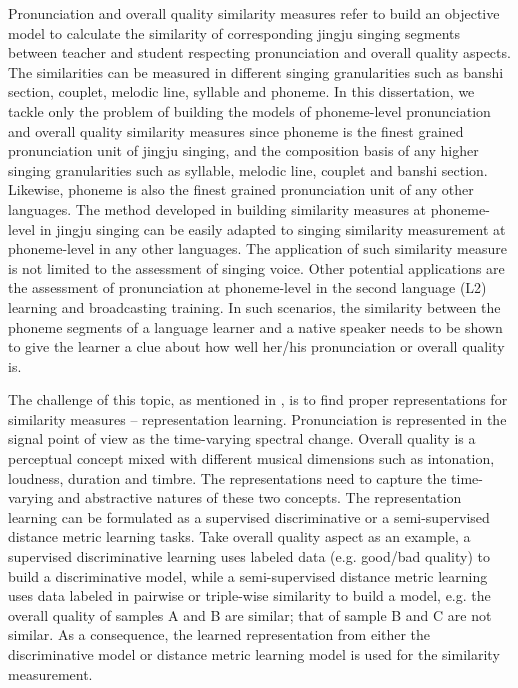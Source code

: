 Pronunciation and overall quality similarity measures refer to build an objective model to calculate the similarity of corresponding jingju singing segments between teacher and student respecting pronunciation and overall quality aspects. The similarities can be measured in different singing granularities such as banshi section, couplet, melodic line, syllable and phoneme. In this dissertation, we tackle only the problem of building the models of phoneme-level pronunciation and overall quality similarity measures since phoneme is the finest grained pronunciation unit of jingju singing, and the composition basis of any higher singing granularities such as syllable, melodic line, couplet and banshi section. Likewise, phoneme is also the finest grained pronunciation unit of any other languages. The method developed in building similarity measures at phoneme-level in jingju singing can be easily adapted to singing similarity measurement at phoneme-level in any other languages. The application of such similarity measure is not limited to the assessment of singing voice. Other potential applications are the assessment of pronunciation at phoneme-level in the second language (L2) learning and broadcasting training. In such scenarios, the similarity between the phoneme segments of a language learner and a native speaker needs to be shown to give the learner a clue about how well her/his pronunciation or overall quality is. 

The challenge of this topic, as mentioned in , is to find proper representations for similarity measures -- representation learning. Pronunciation is represented in the signal point of view as the time-varying spectral change. Overall quality is a perceptual concept mixed with different musical dimensions such as intonation, loudness, duration and timbre. The representations need to capture the time-varying and abstractive natures of these two concepts. The representation learning can be formulated as a supervised discriminative or a semi-supervised distance metric learning tasks. Take overall quality aspect as an example, a supervised discriminative learning uses labeled data (e.g. good/bad quality) to build a discriminative model, while a semi-supervised distance metric learning uses data labeled in pairwise or triple-wise similarity to build a model, e.g. the overall quality of samples A and B are similar; that of sample B and C are not similar. As a consequence, the learned representation from either the discriminative model or distance metric learning model is used for the similarity measurement.

